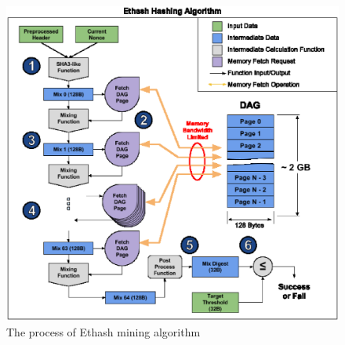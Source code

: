 \documentclass[11pt]{article}
\begin{document}
\begin{appendices}

\begin{figure}[h]
    \centering
    \includegraphics[width=\textwidth]{ethash.eps}
    \caption{The process of Ethash mining algorithm}
    \label{fig:ethash}
\end{figure}

\end{appendices}
\end{document}
